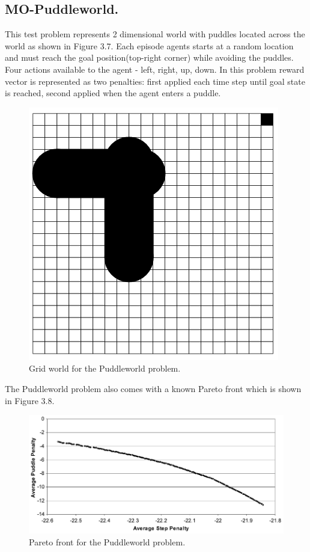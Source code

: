 \subsection{MO-Puddleworld.}
This test problem represents 2 dimensional world with puddles located across the world as shown in Figure 3.7. Each episode agents starts at a random location and must reach the goal position(top-right corner) while avoiding the puddles. Four actions available to the agent - left, right, up, down. In this problem reward vector is represented as two penalties: first applied each time step until goal state is reached, second applied when the agent enters a puddle.
\begin{figure}[ht]
\vskip 0.2in
\centering
\includegraphics[scale=0.9]{pw.png}
\caption{Grid world for the Puddleworld problem.}
\label{ParetoDominance}
\end{figure}

The Puddleworld problem also comes with a known Pareto front which is shown in Figure 3.8.
\begin{figure}[ht]
\vskip 0.2in
\centering
\includegraphics[scale=0.9]{pwParetoFront.png}
\caption{Pareto front for the Puddleworld problem.}
\label{ParetoDominance}
\end{figure}

